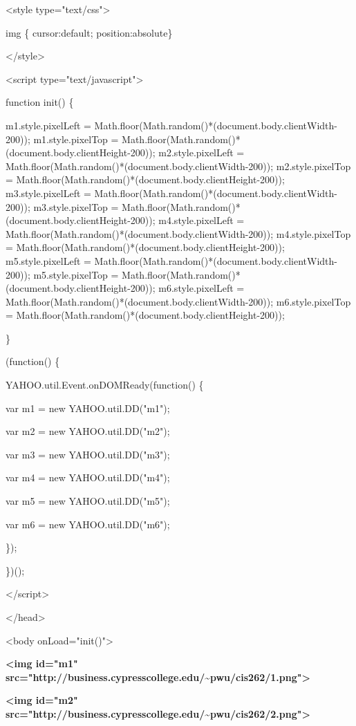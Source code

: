 \documentclass[
]{article}
\begin{document}
\textless style type="text/css"\textgreater{}

img \{ cursor:default; position:absolute\}

\textless/style\textgreater{}

\textless script type="text/javascript"\textgreater{}

function init() \{

m1.style.pixelLeft =
Math.floor(Math.random()*(document.body.clientWidth-200));
m1.style.pixelTop =
Math.floor(Math.random()*(document.body.clientHeight-200));
m2.style.pixelLeft =
Math.floor(Math.random()*(document.body.clientWidth-200));
m2.style.pixelTop =
Math.floor(Math.random()*(document.body.clientHeight-200));
m3.style.pixelLeft =
Math.floor(Math.random()*(document.body.clientWidth-200));
m3.style.pixelTop =
Math.floor(Math.random()*(document.body.clientHeight-200));
m4.style.pixelLeft =
Math.floor(Math.random()*(document.body.clientWidth-200));
m4.style.pixelTop =
Math.floor(Math.random()*(document.body.clientHeight-200));
m5.style.pixelLeft =
Math.floor(Math.random()*(document.body.clientWidth-200));
m5.style.pixelTop =
Math.floor(Math.random()*(document.body.clientHeight-200));
m6.style.pixelLeft =
Math.floor(Math.random()*(document.body.clientWidth-200));
m6.style.pixelTop =
Math.floor(Math.random()*(document.body.clientHeight-200));

\}

(function() \{

YAHOO.util.Event.onDOMReady(function() \{

var m1 = new YAHOO.util.DD("m1");

var m2 = new YAHOO.util.DD("m2");

var m3 = new YAHOO.util.DD("m3");

var m4 = new YAHOO.util.DD("m4");

var m5 = new YAHOO.util.DD("m5");

var m6 = new YAHOO.util.DD("m6");

\});

\})();

\textless/script\textgreater{}

\textless/head\textgreater{}

\textless body onLoad="init()"\textgreater{}

\textbf{\textless img id="m1"
src="http://business.cypresscollege.edu/\textasciitilde pwu/cis262/1.png"\textgreater{}}

\textbf{\textless img id="m2"
src="http://business.cypresscollege.edu/\textasciitilde pwu/cis262/2.png"\textgreater{}}
\end{document}
